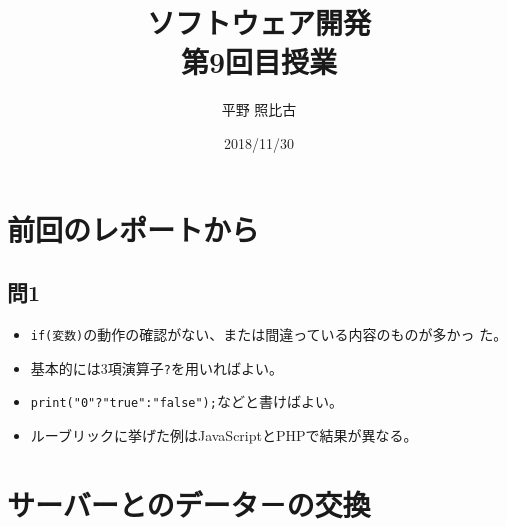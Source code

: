 
\title{ソフトウェア開発\\第9回目授業}
\author{平野 照比古}
\institute{}
\date{2018/11/30}
\newtheorem{Prob}{解説}
\newcommand{\Elm}[1]{\texttt{<#1>}}

\newcommand{\DOMM}{\texttt}
\newcommand{\Event}{\texttt}
\newcommand{\DOMP}{\texttt}
\newcommand{\DOM}{\texttt{DOM}}
\newcommand{\keyitem}{\relax}
\newcommand{\HTML}{HTML文書}

\section{前回のレポートから}
 \subsection{問1}
	\begin{frame}[containsverbatim]
	 \begin{itemize}
		\item \texttt{if(変数)}の動作の確認がない、または間違っている内容のものが多かっ
	た。
		\item 基本的には3項演算子\texttt{?}を用いればよい。
		\item \Verb+print("0"?"true":"false");+などと書けばよい。
		\item ルーブリックに挙げた例はJavaScriptとPHPで結果が異なる。
	 \end{itemize}
 	\end{frame}
	
 \section{サーバーとのデータ－の交換}
